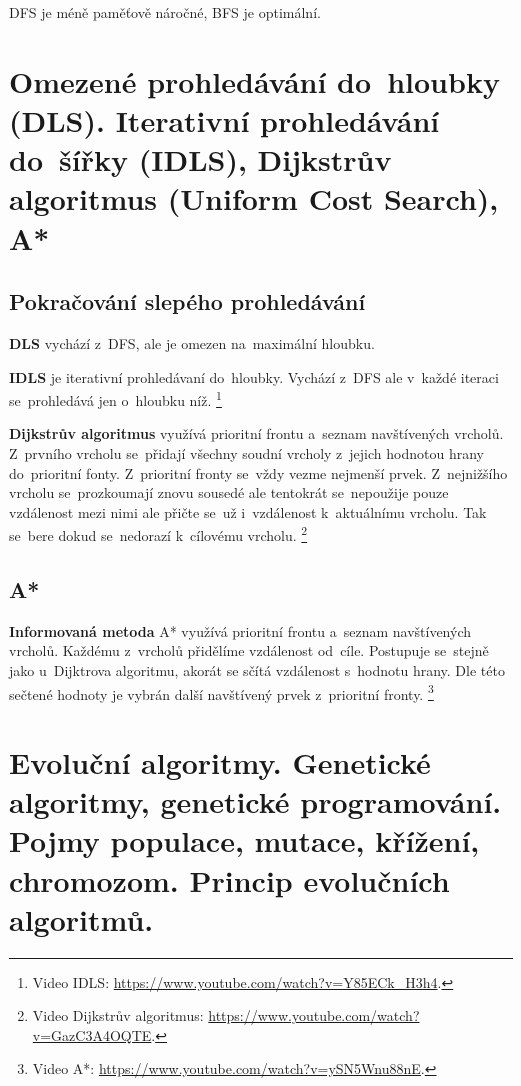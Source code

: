 \vspace*{1em}

DFS je méně paměťově náročné, BFS je optimální.

\clearpage
\section{Omezené prohledávání do~hloubky (DLS). Iterativní prohledávání do~šířky (IDLS), Dijkstrův algoritmus (Uniform Cost Search), A*}

\subsection{Pokračování slepého prohledávání}

\textbf{DLS} vychází z~DFS, ale je omezen na~maximální hloubku.

\textbf{IDLS} je iterativní prohledávaní do~hloubky. Vychází z~DFS ale v~každé iteraci se~prohledává jen o~hloubku níž.%
\footnote{Video IDLS: \url{https://www.youtube.com/watch?v=Y85ECk_H3h4}.}

\textbf{Dijkstrův algoritmus} využívá prioritní frontu a~seznam navštívených vrcholů. Z~prvního vrcholu se~přidají všechny soudní vrcholy z~jejich hodnotou hrany do~prioritní fonty. Z~prioritní fronty se~vždy vezme nejmenší prvek. Z~nejnižšího vrcholu se~prozkoumají znovu sousedé ale tentokrát se~nepoužije pouze vzdálenost mezi nimi ale přičte se~už i~vzdálenost k~aktuálnímu vrcholu. Tak se~bere dokud se~nedorazí k~cílovému vrcholu.%
\footnote{Video Dijkstrův algoritmus: \url{https://www.youtube.com/watch?v=GazC3A4OQTE}.}

\subsection{A*}

\textbf{Informovaná metoda} A* využívá prioritní frontu a~seznam navštívených vrcholů. Každému z~vrcholů přidělíme vzdálenost od~cíle. Postupuje se~stejně jako u~Dijktrova algoritmu, akorát se sčítá vzdálenost s~hodnotu hrany. Dle této sečtené hodnoty je vybrán další navštívený prvek z~prioritní fronty.%
\footnote{Video A*: \url{https://www.youtube.com/watch?v=ySN5Wnu88nE}.}

\clearpage
\section{Evoluční algoritmy. Genetické algoritmy, genetické programování. Pojmy populace, mutace, křížení, chromozom. Princip evolučních algoritmů.}

